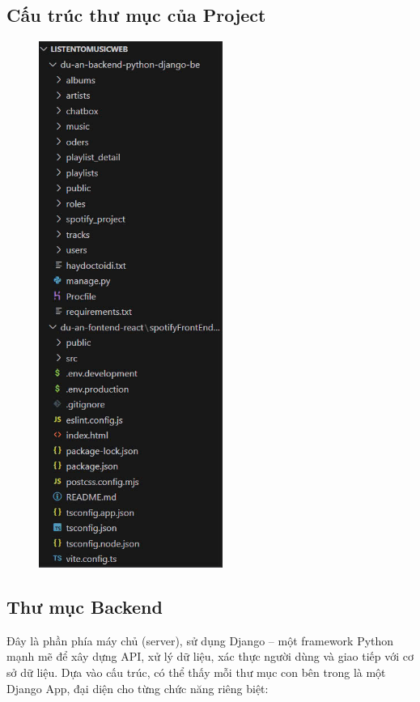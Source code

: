 \documentclass[a4paper]{article}
\begin{document}
    \subsection{Cấu trúc thư mục của Project}
\begin{figure}[h!]
\begin{center}
\includegraphics[width=6cm]{img/thumuc1.jpg}
\end{center}
\end{figure}

\newpage

    \subsection{Thư mục Backend}
    Đây là phần phía máy chủ (server), sử dụng Django – một framework Python mạnh mẽ để xây dựng API, xử lý dữ liệu, xác thực người dùng và giao tiếp với cơ sở dữ liệu. Dựa vào cấu trúc, có thể thấy mỗi thư mục con bên trong là một Django App, đại diện cho từng chức năng riêng biệt:\\
\end{document}
